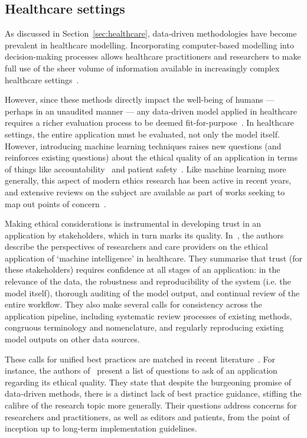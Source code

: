 \subsection{Healthcare settings}

As discussed in Section~\ref{sec:healthcare}, data-driven methodologies have
become prevalent in healthcare modelling. Incorporating computer-based modelling
into decision-making processes allows healthcare practitioners and researchers
to make full use of the sheer volume of information available in increasingly
complex healthcare
settings~\cite{Alexander2018,Belle2015,Taranu2016,Tomar2013,Tsui2015}.

However, since these methods directly impact the well-being of humans ---
perhaps in an unaudited manner --- any data-driven model applied in healthcare
requires a richer evaluation process to be deemed
fit-for-purpose~\cite{Boaz2003,Gerhards2020,Ho2020}. In healthcare settings, the
entire application must be evaluated, not only the model itself. However,
introducing machine learning techniques raises new questions (and reinforces
existing questions) about the ethical quality of an application in terms of
things like
accountability~\cite{McCradden2020accountability,Ross2017,Zawati2020} and
patient safety~\cite{Habli2020,McCradden2020safety,Sittig2015}. Like machine
learning more generally, this aspect of modern ethics research has been active
in recent years, and extensive reviews on the subject are available as part of
works seeking to map out points of
concern~\cite{Char2020,Grote2020,Obermeyer2016,Rajkomar2019}.

Making ethical considerations is instrumental in developing trust in an
application by stakeholders, which in turn marks its quality.
In~\cite{Cutillo2020}, the authors describe the perspectives of researchers and
care providers on the ethical application of `machine intelligence' in
healthcare. They summarise that trust (for these stakeholders) requires
confidence at all stages of an application: in the relevance of the data, the
robustness and reproducibility of the system (i.e. the model itself), thorough
auditing of the model output, and continual review of the entire workflow. They
also make several calls for consistency across the application pipeline,
including systematic review processes of existing methods, congruous terminology
and nomenclature, and regularly reproducing existing model outputs on other data
sources.

These calls for unified best practices are matched in recent
literature~\cite{Liu2019,Monks2018,Vollmer2020,WitjasPaalberends2017}. For
instance, the authors of~\cite{Vollmer2020} present a list of questions to ask
of an application regarding its ethical quality. They state that despite the
burgeoning promise of data-driven methods, there is a distinct lack of best
practice guidance, stifling the calibre of the research topic more generally.
Their questions address concerns for researchers and practitioners, as well as
editors and patients, from the point of inception up to long-term implementation
guidelines.

